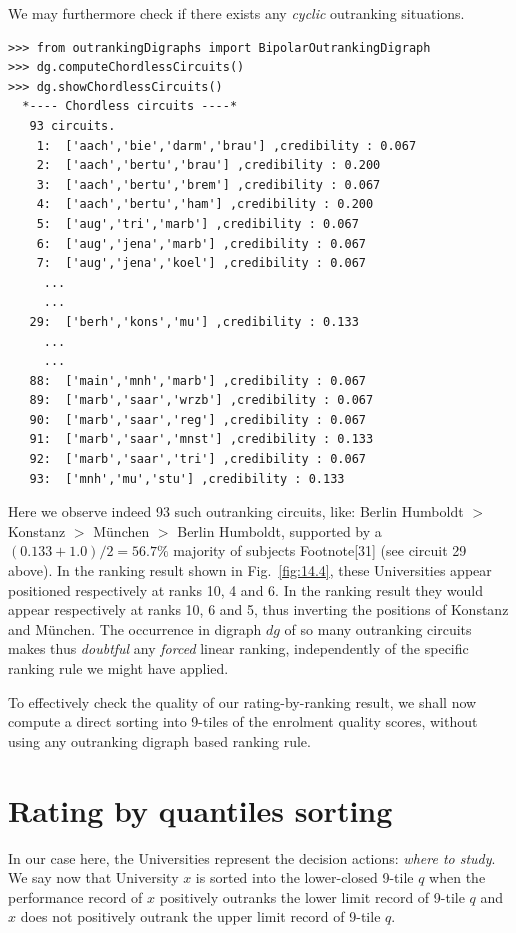 We may furthermore check if there exists any \emph{cyclic} outranking situations.
\begin{lstlisting}[caption={Enumerating chordless outranking circuits},label=list:14.5]
>>> from outrankingDigraphs import BipolarOutrankingDigraph
>>> dg.computeChordlessCircuits()
>>> dg.showChordlessCircuits()
  *---- Chordless circuits ----*
   93 circuits.
    1:  ['aach','bie','darm','brau'] ,credibility : 0.067
    2:  ['aach','bertu','brau'] ,credibility : 0.200
    3:  ['aach','bertu','brem'] ,credibility : 0.067
    4:  ['aach','bertu','ham'] ,credibility : 0.200
    5:  ['aug','tri','marb'] ,credibility : 0.067
    6:  ['aug','jena','marb'] ,credibility : 0.067
    7:  ['aug','jena','koel'] ,credibility : 0.067
     ...
     ...
   29:  ['berh','kons','mu'] ,credibility : 0.133
     ...
     ...
   88:  ['main','mnh','marb'] ,credibility : 0.067
   89:  ['marb','saar','wrzb'] ,credibility : 0.067
   90:  ['marb','saar','reg'] ,credibility : 0.067
   91:  ['marb','saar','mnst'] ,credibility : 0.133
   92:  ['marb','saar','tri'] ,credibility : 0.067
   93:  ['mnh','mu','stu'] ,credibility : 0.133
 \end{lstlisting}
Here we observe indeed 93 such outranking circuits, like: Berlin Humboldt $>$ Konstanz $>$ München $>$ Berlin Humboldt, supported by a $(0.133 + 1.0)/2 = 56.7\%$ majority of subjects Footnote[31] (see circuit 29 above). In the \Copeland ranking result shown in Fig.~\vref{fig:14.4}, these Universities appear positioned respectively at ranks 10, 4 and 6. In the \NetFlows ranking result they would appear respectively at ranks 10, 6 and 5, thus inverting the positions of Konstanz and München. The occurrence in digraph $dg$ of so many outranking circuits makes thus \emph{doubtful} any \emph{forced} linear ranking, independently of the specific ranking rule we might have applied.

To effectively check the quality of our \Copeland rating-by-ranking result, we shall now compute a direct sorting into 9-tiles of the enrolment quality scores, without using any outranking digraph based ranking rule.

\section{Rating by quantiles sorting}
\label{sec:14.3}

In our case here, the Universities represent the decision actions: \emph{where to study}. We say now that University $x$ is sorted into the lower-closed 9-tile $q$ when the performance record of $x$ positively outranks the lower limit record of 9-tile $q$ and $x$ does not positively outrank the upper limit record of 9-tile $q$. 

